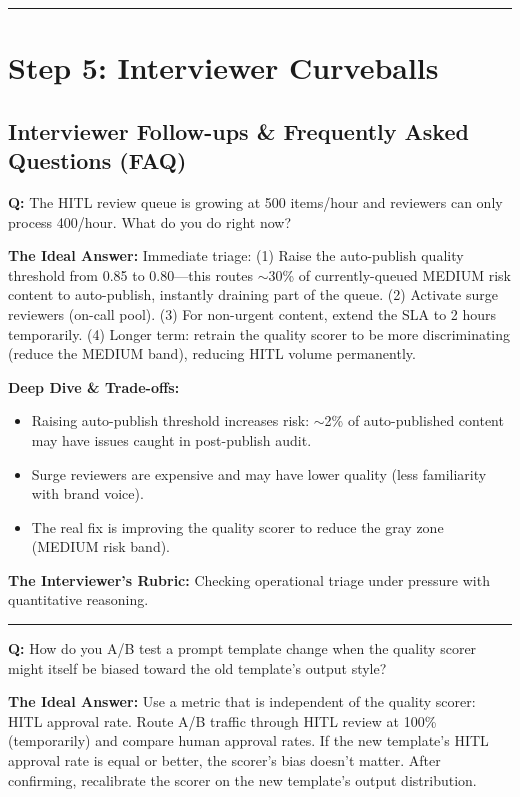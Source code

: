 \bigskip\hrule\bigskip

\section*{Step 5: Interviewer Curveballs}

\subsection*{Interviewer Follow-ups \& Frequently Asked Questions (FAQ)}

\textbf{Q:} The HITL review queue is growing at 500 items/hour and reviewers can only process 400/hour. What do you do right now?

\textbf{The Ideal Answer:} Immediate triage: (1) Raise the auto-publish quality threshold from 0.85 to 0.80---this routes $\sim$30\% of currently-queued MEDIUM risk content to auto-publish, instantly draining part of the queue. (2) Activate surge reviewers (on-call pool). (3) For non-urgent content, extend the SLA to 2 hours temporarily. (4) Longer term: retrain the quality scorer to be more discriminating (reduce the MEDIUM band), reducing HITL volume permanently.

\textbf{Deep Dive \& Trade-offs:}
\begin{itemize}
  \item Raising auto-publish threshold increases risk: $\sim$2\% of auto-published content may have issues caught in post-publish audit.
  \item Surge reviewers are expensive and may have lower quality (less familiarity with brand voice).
  \item The real fix is improving the quality scorer to reduce the gray zone (MEDIUM risk band).
\end{itemize}

\textbf{The Interviewer's Rubric:} Checking operational triage under pressure with quantitative reasoning.

\bigskip\hrule\bigskip

\textbf{Q:} How do you A/B test a prompt template change when the quality scorer might itself be biased toward the old template's output style?

\textbf{The Ideal Answer:} Use a metric that is independent of the quality scorer: HITL approval rate. Route A/B traffic through HITL review at 100\% (temporarily) and compare human approval rates. If the new template's HITL approval rate is equal or better, the scorer's bias doesn't matter. After confirming, recalibrate the scorer on the new template's output distribution.

